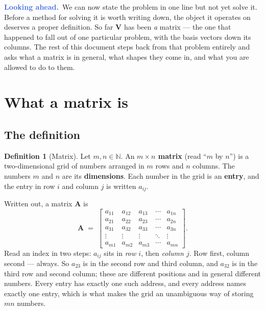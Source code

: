 \documentclass[11pt]{article}
\theoremstyle{plain}
\theoremstyle{definition}
\newtheorem{defn}{Definition}[section]
\theoremstyle{remark}
\newcommand{\lookahead}{\par\smallskip\noindent
  \textbf{\sffamily\textcolor{RoyalBlue}{Looking ahead.}}\ \ignorespaces}
\newcommand{\mt}[1]{\mathbf{#1}}        %
\newcommand{\N}{\mathbb{N}}
\begin{document}
\lookahead We can now state the problem in one line but not yet solve it. Before
a method for solving it is worth writing down, the object it operates on
deserves a proper definition. So far $\mt{V}$ has been \emph{a} matrix --- the
one that happened to fall out of one particular problem, with the basis vectors
down its columns. The rest of this document steps back from that problem
entirely and asks what a matrix is in general, what shapes they come in, and
what you are allowed to do to them.

\section{What a matrix is}

\subsection{The definition}
\begin{defn}[Matrix]
Let $m,n\in\N$. An \textbf{$m\times n$ matrix} (read ``$m$ by $n$'') is a
two-dimensional grid of numbers arranged in $m$ rows and $n$ columns. The
numbers $m$ and $n$ are its \textbf{dimensions}. Each number in the grid is an
\textbf{entry}, and the entry in row $i$ and column $j$ is written $a_{ij}$.
\end{defn}

\noindent Written out, a matrix $\mt{A}$ is
\[
  \mt{A} \;=\;
  \begin{bmatrix}
    a_{11} & a_{12} & a_{13} & \cdots & a_{1n}\\
    a_{21} & a_{22} & a_{23} & \cdots & a_{2n}\\
    a_{31} & a_{32} & a_{33} & \cdots & a_{3n}\\
    \vdots & \vdots & \vdots & \ddots & \vdots\\
    a_{m1} & a_{m2} & a_{m3} & \cdots & a_{mn}
  \end{bmatrix} .
\]
Read an index in two steps: $a_{ij}$ sits in \emph{row $i$}, then \emph{column
$j$}. Row first, column second --- always. So $a_{23}$ is in the second row and
third column, and $a_{32}$ is in the third row and second column; these are
different positions and in general different numbers. Every entry has exactly
one such address, and every address names exactly one entry, which is what makes
the grid an unambiguous way of storing $mn$ numbers.
\end{document}
